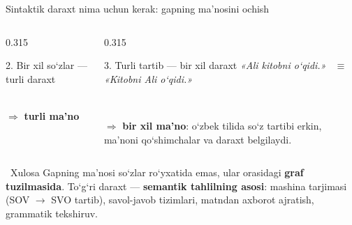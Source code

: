 \documentclass[aspectratio=169,11pt]{beamer}
\begin{document}
\begin{frame}{Sintaktik daraxt nima uchun kerak: gapning ma’nosini ochish}
\begin{columns}[T,onlytextwidth]
\begin{column}{0.315\textwidth}
\begin{block}{2. Bir xil so‘zlar --- turli daraxt}
\\[2pt]
      \scriptsize $\Rightarrow$ \textbf{turli ma’no}
    \end{block}
  \end{column}
  \begin{column}{0.315\textwidth}
    \begin{block}{3. Turli tartib --- bir xil daraxt}
      \centering
      {\scriptsize\itshape «Ali kitobni o‘qidi.» \ $\equiv$\\ «Kitobni Ali o‘qidi.»}\\[3pt]
      \\[3pt]
      \raggedright\scriptsize $\Rightarrow$ \textbf{bir xil ma’no}: o‘zbek tilida so‘z tartibi erkin, ma’noni qo‘shimchalar va daraxt belgilaydi.
    \end{block}
  \end{column}
  \end{columns}
  \vspace{2pt}
  \begin{alertblock}{\faLightbulb\ Xulosa}
    \scriptsize Gapning ma’nosi so‘zlar ro‘yxatida emas, ular orasidagi \textbf{graf tuzilmasida}. To‘g‘ri daraxt --- \textbf{semantik tahlilning asosi}: mashina tarjimasi (SOV $\to$ SVO tartib), savol-javob tizimlari, matndan axborot ajratish, grammatik tekshiruv.
  \end{alertblock}
\end{frame}
\end{document}
